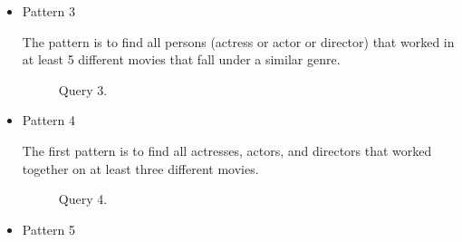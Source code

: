 \begin{itemize}
\item Pattern 3

The pattern is to find all persons (actress or actor or director) that worked in at least 5 different movies that fall under a similar genre.


\begin{figure}[t]
\centering
{}
\caption{Query 3.}
\label{fig:query3}
\centering
\end{figure}

\item Pattern 4

The first pattern is to find all actresses, actors, and directors that worked together on at least three different movies.


\begin{figure}[t]
\centering
{}
\caption{Query 4.}
\label{fig:query4}
\centering
\end{figure}

\item Pattern 5


\end{itemize}
